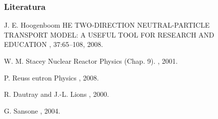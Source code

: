 \documentclass[czech]{beamer}
\begin{document}
\begin{frame}[label=slide17]
  \frametitle<presentation>{Literatura}
  
	
  \begin{thebibliography}{\textwidth}       
  \beamertemplatearticlebibitems
	\footnotesize
  {J. E. Hoogenboom}
	HE TWO-DIRECTION NEUTRAL-PARTICLE TRANSPORT MODEL: A USEFUL TOOL FOR RESEARCH AND EDUCATION
	, 37:65--108, 2008.

	{W. M. Stacey}
	\newblock Nuclear Reactor Physics (Chap. 9).
	, 
	  2001.

	{P}. {R}euss
	eutron {P}hysics
	, 2008.
	
	{R. Dautray and J.-L. Lions}
  , 2000.
	
		{G. Sansone}
  , 2004.
	\end{thebibliography}
	
\end{frame}
\end{document}
